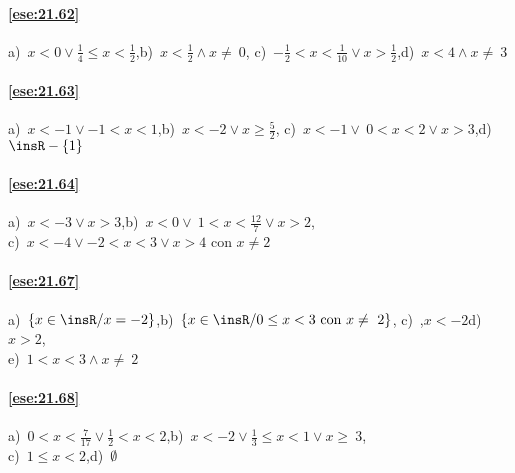 \paragraph{\ref{ese:21.62}} a)~$x<0\vee\frac{1}{4}\le x<\frac{1}{2}$,\quad b)~$x<\frac{1}{2}\wedge x\neq~0$,\quad
c)~$-\frac{1}{2}<x<\frac{1}{10}\vee x>\frac{1}{2}$,\quad d)~$x<4\wedge x\neq~3$

\paragraph{\ref{ese:21.63}} a)~$x<-1\vee -1<x<1$,\quad b)~$x<-2\vee x\ge \frac{5}{2}$,\quad
c)~$x<-1\vee~0<x<2\vee x>3$,\quad d)~$\insR-\{1\}$

\paragraph{\ref{ese:21.64}} a)~$x<-3\vee x>3$,\quad b)~$x<0\vee~1<x<\frac{12}{7}\vee x>2$,\quad
\protect\\ c)~$x<-4\vee -2<x<3\vee x>4\text{ con }x\neq2$

\paragraph{\ref{ese:21.67}} a)~$\left\{x\in\insR/x=-2\right\}$,\quad b)~$\left\{x\in \insR/0\le x<3\text{ con }x\neq~2\right\}$,\quad
c)~,$x<-2$\quad d)~$x>2$,\quad
\protect\\ e)~$1<x<3\wedge x\neq~2$

\paragraph{\ref{ese:21.68}} a)~$0<x<\frac{7}{17}\vee\frac{1}{2}<x<2$,\quad b)~$x<-2\vee \frac{1}{3}\le x<1\vee x\ge~3$,\quad
\protect\\ c)~$1\le x<2$,\quad d)~$\emptyset $
